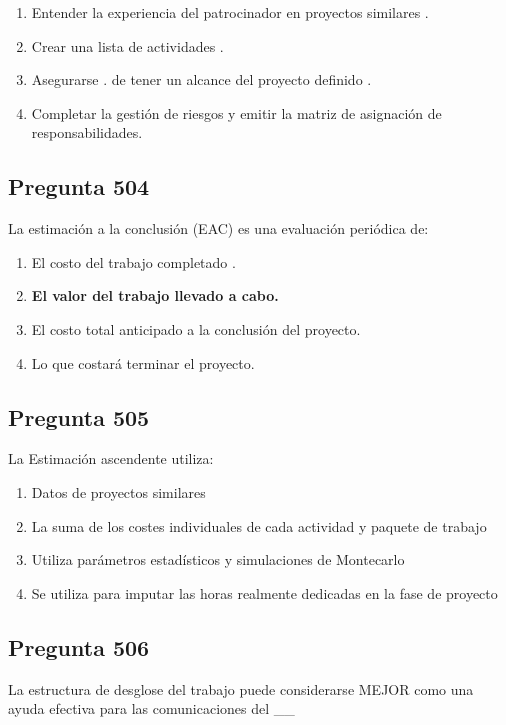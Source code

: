 \documentclass[11pt,a4paper]{article}
\begin{document}
\begin{enumerate}[label=\alph*)]
  \item Entender la experiencia del patrocinador en proyectos similares .
  \item Crear una lista de actividades .
  \item Asegurarse . de tener un alcance del proyecto definido .
  \item Completar la gestión de riesgos y emitir la matriz de asignación de responsabilidades.
\end{enumerate}

\subsection*{Pregunta 504}
La estimación a la conclusión (EAC) es una evaluación periódica de:

\begin{enumerate}[label=\alph*)]
  \item El costo del trabajo completado .
  \item \textbf{El valor del trabajo llevado a cabo.}
  \item El costo total anticipado a la conclusión del proyecto.
  \item Lo que costará terminar el proyecto.
\end{enumerate}

\subsection*{Pregunta 505}
La Estimación ascendente utiliza:

\begin{enumerate}[label=\alph*)]
  \item Datos de proyectos similares
  \item La suma de los costes individuales de cada actividad y paquete de trabajo
  \item Utiliza parámetros estadísticos y simulaciones de Montecarlo
  \item Se utiliza para imputar las horas realmente dedicadas en la fase de proyecto
\end{enumerate}

\subsection*{Pregunta 506}
La estructura de desglose del trabajo puede considerarse MEJOR como una ayuda efectiva para las comunicaciones del \_\_
\end{document}
